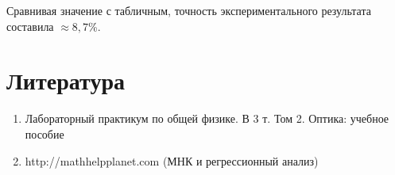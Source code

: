 \documentclass[a4paper, 12pt]{article}%
\begin{document}
	 Сравнивая значение с табличным, точность экспериментального результата составила $\approx 8,7$\%.
	
	\section{Литература}

\begin{enumerate}

\item Лабораторный практикум по общей физике. В 3 т. Том 2. Оптика: учебное пособие

\item http://mathhelpplanet.com (МНК и регрессионный анализ)


\end{enumerate}	
\end{document}

